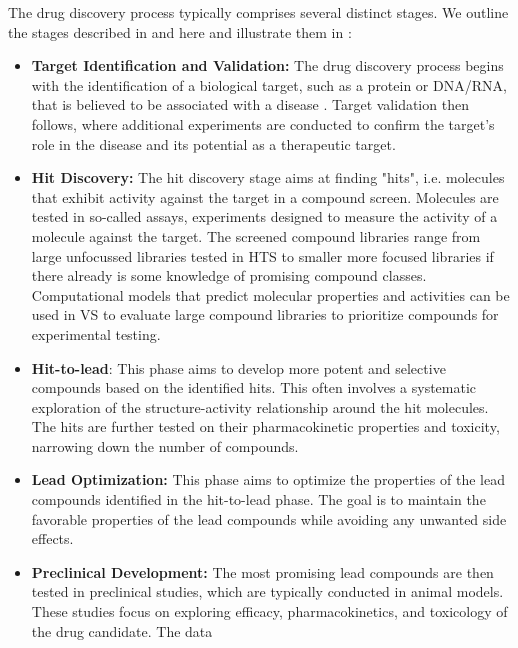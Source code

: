 The drug discovery process typically comprises several distinct stages. We outline the stages
described in \citet{hughesPrinciplesEarlyDrug2011} and \citep{umscheidKeyConceptsClinical2011} here and illustrate them in :
\begin{itemize}
	\item \textbf{Target Identification and Validation:} The drug discovery process begins with the
	      identification of a biological target, such as a protein or DNA/RNA, that is believed
	      to be associated with a disease \citep{immingDrugsTheirTargets2006}. Target validation then follows, where additional
	      experiments are conducted to confirm the target's role in the disease and its potential as
	      a therapeutic target.
	\item \textbf{Hit Discovery:} The hit discovery stage aims at finding "hits", i.e. molecules
	      that exhibit activity against the target in a compound screen. Molecules are tested in
	      so-called assays, experiments designed to measure the activity of a molecule against the
	      target. The screened compound libraries range from large unfocussed libraries tested in
	      \ac{HTS} to smaller more focused libraries if there already is some knowledge of promising
	      compound classes. Computational models that predict molecular properties and activities
	      can be used in \ac{VS}
	      \citep{waltersVirtualScreeningOverview1998,shoichetVirtualScreeningChemical2004a} to
	      evaluate large compound libraries to prioritize compounds for experimental testing.
	\item \textbf{Hit-to-lead}: This phase aims to develop more potent and selective compounds
	      based on the identified hits. This often involves a systematic exploration of the
	      structure-activity relationship around the hit molecules.  The hits are further tested on
	      their pharmacokinetic properties and toxicity, narrowing down the number of
	      compounds.
	\item \textbf{Lead Optimization:} This phase aims to optimize the properties of the
	      lead compounds identified in the hit-to-lead phase. The goal is to maintain the favorable
	      properties of the lead compounds while avoiding any unwanted side effects.
	\item \textbf{Preclinical Development:} The most promising lead compounds are then tested in
	      preclinical studies, which are typically conducted in animal models. These studies focus
	      on exploring efficacy, pharmacokinetics, and toxicology of the drug candidate. The data

\end{itemize}
